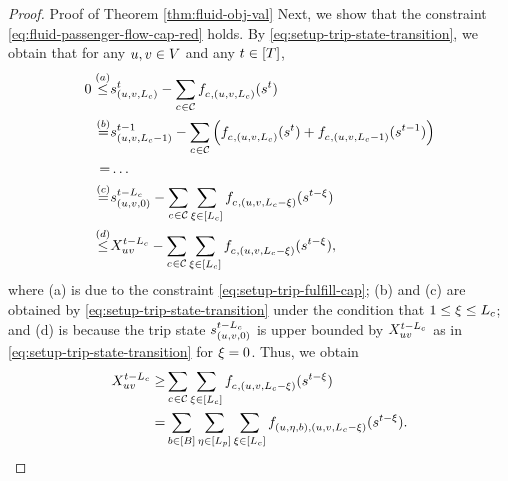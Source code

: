 \begin{proof}{Proof of Theorem \ref{thm:fluid-obj-val}}
    Next, we show that the constraint \eqref{eq:fluid-passenger-flow-cap-red} holds. By \eqref{eq:setup-trip-state-transition}, we obtain that for any $u, v \in V$ and any $t \in [T]$, %
    \begin{align*}
        0 \stackrel{(a)}{\leq}& s_{(u, v, L_c)}^{t} - \sum_{c_{} \in \mathcal{C}} f^{}_{c_{}, (u, v, L_c)}(s^t)\\
        \stackrel{(b)}{=}& s_{(u, v, L_c - 1)}^{t - 1} - \sum_{c_{} \in \mathcal{C}} \left(f^{}_{c_{}, (u, v, L_c)}(s^t) + f^{}_{c_{}, (u, v, L_c - 1)}(s^{t-1}) \right)\\
        =& \dots\\
        \stackrel{(c)}{=}& s_{(u, v, 0)}^{t - L_c} - \sum_{c_{} \in \mathcal{C}} \sum_{\xi \in [L_c]} f^{}_{c_{}, (u, v, L_c - \xi)}(s^{t - \xi})\\
        \stackrel{(d)}{\leq}& X_{uv}^{t - L_c} - \sum_{c_{} \in \mathcal{C}} \sum_{\xi \in [L_c]} f^{}_{c_{}, (u, v, L_c - \xi)}(s^{t - \xi}),
    \end{align*}
    where (a) is due to the constraint \eqref{eq:setup-trip-fulfill-cap}; (b) and (c) are obtained by \eqref{eq:setup-trip-state-transition} under the condition that $1 \leq \xi \leq L_c$; and (d) is because the trip state $s_{(u, v, 0)}^{t - L_c}$ is upper bounded by $X_{uv}^{t - L_c}$ as in \eqref{eq:setup-trip-state-transition} for $\xi = 0$.
    Thus, we obtain 
    \begin{align*}
        \arrnum{\origin\destination}{\time - \Lc} \geq& \sum_{\cartype{} \in \Cartype} \sum_{\tripactivetime \in [\Lc]} \jointtripfulfillaction{\cartype{}, (\origin, \destination, \Lc - \tripactivetime)}{}(s^{\time - \tripactivetime}) \\
        =& \sum_{\battery \in [\range]} \sum_{\timetoarrival \in [\Lp]} \sum_{\tripactivetime \in [\Lc]} \jointtripfulfillaction{(\origin, \timetoarrival, \battery), (\origin, \destination, \Lc - \tripactivetime)}{}(s^{\time - \tripactivetime}).

\end{align*}
\end{proof}
